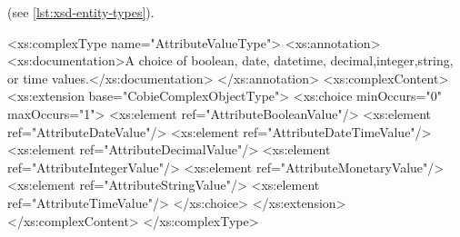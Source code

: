 (see \autoref{lst:xsd-entity-types}).








<xs:complexType name="AttributeValueType">
		<xs:annotation>
			<xs:documentation>A choice of boolean, date, datetime, decimal,integer,string, or time values.</xs:documentation>
		</xs:annotation>
		<xs:complexContent>
			<xs:extension base="CobieComplexObjectType">
				<xs:choice minOccurs="0" maxOccurs="1">
					<xs:element ref="AttributeBooleanValue"/>
					<xs:element ref="AttributeDateValue"/>
					<xs:element ref="AttributeDateTimeValue"/>
					<xs:element ref="AttributeDecimalValue"/>
					<xs:element ref="AttributeIntegerValue"/>
					<xs:element ref="AttributeMonetaryValue"/>
					<xs:element ref="AttributeStringValue"/>
					<xs:element ref="AttributeTimeValue"/>
				</xs:choice>
			</xs:extension>
		</xs:complexContent>
	</xs:complexType>



